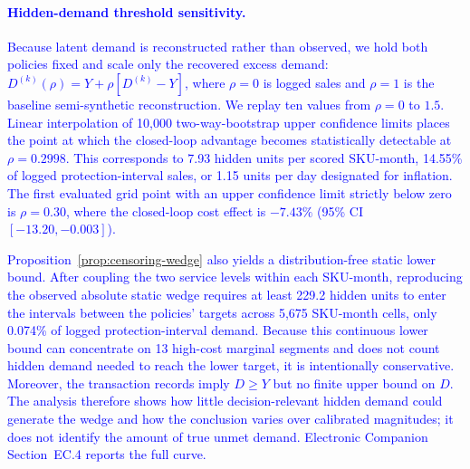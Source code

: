 \documentclass[msom,dblanonrev]{informs4}
\newcommand{\add}[1]{\textcolor{blue}{#1}}
\begin{document}
\paragraph{\add{Hidden-demand threshold sensitivity.}}
\add{Because latent demand is reconstructed rather than observed, we hold both policies fixed and scale only the recovered excess demand: $D^{(k)}(\rho)=Y+\rho[D^{(k)}-Y]$, where $\rho=0$ is logged sales and $\rho=1$ is the baseline semi-synthetic reconstruction. We replay ten values from $\rho=0$ to $1.5$. Linear interpolation of 10{,}000 two-way-bootstrap upper confidence limits places the point at which the closed-loop advantage becomes statistically detectable at $\rho=0.2998$. This corresponds to 7.93 hidden units per scored SKU-month, 14.55\% of logged protection-interval sales, or 1.15 units per day designated for inflation. The first evaluated grid point with an upper confidence limit strictly below zero is $\rho=0.30$, where the closed-loop cost effect is $-7.43\%$ (95\% CI $[-13.20,-0.003]$).}

\add{Proposition~\ref{prop:censoring-wedge} also yields a distribution-free static lower bound. After coupling the two service levels within each SKU-month, reproducing the observed absolute static wedge requires at least 229.2 hidden units to enter the intervals between the policies' targets across 5{,}675 SKU-month cells, only 0.074\% of logged protection-interval demand. Because this continuous lower bound can concentrate on 13 high-cost marginal segments and does not count hidden demand needed to reach the lower target, it is intentionally conservative. Moreover, the transaction records imply $D\geq Y$ but no finite upper bound on $D$. The analysis therefore shows how little decision-relevant hidden demand could generate the wedge and how the conclusion varies over calibrated magnitudes; it does not identify the amount of true unmet demand. Electronic Companion Section~EC.4 reports the full curve.}
\end{document}
